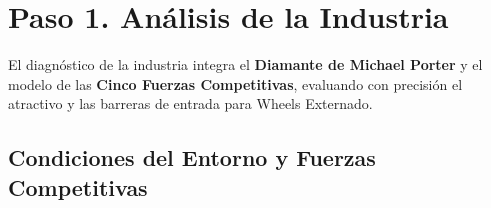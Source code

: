 \documentclass[11pt,a4paper]{article}
\begin{document}
\vspace{0.2cm}

\section{Paso 1. An\'alisis de la Industria}

El diagn\'ostico de la industria integra el \textbf{Diamante de Michael Porter} y el modelo de las \textbf{Cinco Fuerzas Competitivas}, evaluando con precisi\'on el atractivo y las barreras de entrada para Wheels Externado.

\subsection{Condiciones del Entorno y Fuerzas Competitivas}
\end{document}
